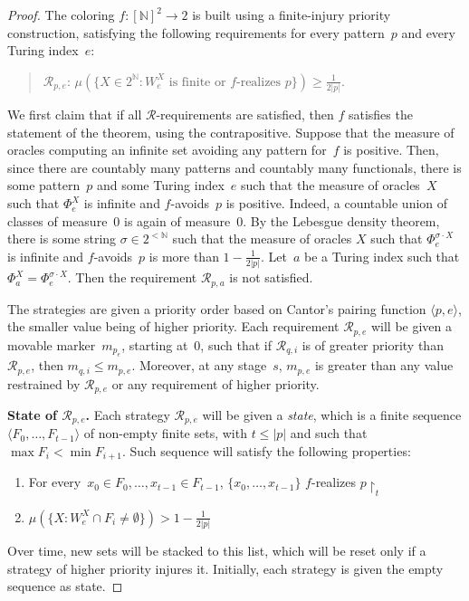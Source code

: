 \documentclass{article}
\newcommand{\cs}{2^{\NN}}
\newcommand{\bstr}{2^{<\NN}}
\newcommand{\uh}{\upharpoonright}
\newcommand{\NN}[0]{\mathbb{N}}
\def\NN{\mathbb{N}}
\newcommand{\R}{\mathcal{R}}
\numberwithin{theorem}{section}
\theoremstyle{definition}
\begin{document}
\begin{proof}
The coloring $f : [\NN]^2 \to 2$ is built using a finite-injury priority construction, satisfying the following requirements for every pattern~$p$ and every Turing index~$e$:
\begin{quote}
    $\R_{p,e}$: $\mu(\{ X \in \cs : W_e^X \mbox{ is finite or } f\mbox{-realizes } p \}) \geq \frac{1}{2|p|}$.
\end{quote}
We first claim that if all $\R$-requirements are satisfied, then $f$ satisfies the statement of the theorem, using the contrapositive.
Suppose that the measure of oracles computing an infinite set avoiding any pattern for~$f$ is positive.
Then, since there are countably many patterns and countably many functionals, there is some pattern~$p$ and some Turing index~$e$ such that the measure of oracles~$X$ such that $\Phi_e^X$ is infinite and $f$-avoids~$p$ is positive. Indeed, a countable union of classes of measure~0 is again of measure~0. By the Lebesgue density theorem, there is some string $\sigma \in \bstr$ such that  the measure of oracles $X$ such that $\Phi_e^{\sigma \cdot X}$ is infinite and $f$-avoids~$p$ is more than $1-\frac{1}{2|p|}$.
Let~$a$ be a Turing index such that $\Phi_a^X = \Phi_e^{\sigma \cdot X}$. Then the requirement $\R_{p, a}$ is not satisfied. 
\smallskip

The strategies are given a priority order based on Cantor's pairing function $\langle p, e\rangle$, the smaller value being of higher priority. Each requirement $\R_{p, e}$ will be given a movable marker~$m_{p_e}$, starting at~0, such that if $\R_{q, i}$ is of greater priority than $\R_{p, e}$, then $m_{q, i} \leq m_{p, e}$. Moreover, at any stage~$s$, $m_{p,e}$ is greater than any value restrained by $\R_{p, e}$ or any requirement of higher priority.
\smallskip

\textbf{State of $\R_{p,e}$.}
Each strategy $\R_{p, e}$ will be given a \emph{state}, which is a finite sequence $\langle F_0, \dots, F_{t-1}\rangle$ of non-empty finite sets, with $t \leq |p|$ and such that $\max F_i < \min F_{i+1}$. Such sequence will satisfy the following properties:
\begin{enumerate}
    \item[(P1)] For every~$x_0 \in F_0, \dots, x_{t-1} \in F_{t-1}$, $\{x_0, \dots, x_{t-1}\}$ $f$-realizes $p \uh_t$
    \item[(P2)] $\mu(\{ X : W_e^X \cap F_i \neq \emptyset \}) > 1-\frac{1}{2|p|}$
\end{enumerate}
Over time, new sets will be stacked to this list, which will be reset only if a strategy of higher priority injures it. Initially, each strategy is given the empty sequence as state.



\end{proof}
\end{document}

